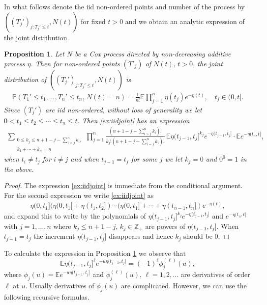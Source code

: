 \documentclass[11pt,leqno%
]{amsart}
\newtheorem{proposition}[lemma]{Proposition}
\newcommand{\E }{{\mathbb E}}
\newcommand{\Z }{{\mathbb Z}}
\renewcommand{\P }{{\mathbb P}}
\newcommand{\1}{{\mathbf 1}}
\begin{document}
In what follows denote the iid non-ordered points and number of the process
by $((T_j')_{j:T_j'\le t},N(t))$ for fixed $t>0$ and we obtain an analytic
expression of the joint distribution. 
\begin{proposition}
\label{prop:jointdist}
 Let $N$ be a Cox process directed by non-decreasing additive process
 $\eta$. Then for non-ordered points $(T'_j)$ of $N(t),\,t>0$, the joint distribution of $((T_j')_{j:T_j'\le t},N(t))$ is 
\begin{align}
\label{ex:iidjoint}
 \P(T_1' \le t_1,\ldots,T_n' \le t_n,\,N(t)=n) =
 \frac{1}{n!}\E \prod_{j=1}^n \eta(t_j) e^{-\eta(t)},\quad t_j\in
 (0,t]. 
\end{align}
 Since $(T_j')$ are iid non-ordered, without loss of
 generality we let $0<t_1\le t_2\le \cdots \le t_n \le t$. Then
 \eqref{ex:iidjoint} has an expression 
\begin{align*}
 \sum_{\substack{0\le k_j \le n+1-j-\sum_{i>j}^n k_i, \\ k_1+\cdots +k_n=n}} \prod_{j=1}^n
 \frac{(n+1-j-\sum_{i>j}^n k_i)!}{k_j!(n+1-j-\sum_{i=j}^n k_i)! }\, 
 \E \eta(t_{j-1},t_j]^{k_j} e^{-\eta(t_{j-1},t_j]}\cdot \E
 e^{-\eta(t_n,t]},  
\end{align*}
 when $t_i\neq t_j$ for $i\neq j$ and when $t_{j-1}=t_j$ for some $j$ we
 let $k_j=0$ and $0^0=1$ in the above. 
\end{proposition}

\begin{proof}
 The expression \eqref{ex:iidjoint} is immediate from the conditional
 argument. For the second expression we write \eqref{ex:iidjoint} as 
\begin{align*}
 \eta(0,t_1](\eta(0,t_1]+\eta(t_1,t_2])\cdots(\eta(0,t_1]+\cdots+\eta(t_{n-1},t_n])
 e^{-\eta(t)}, 
\end{align*}
 and expand this to write by the polynomials of
 $\eta(t_{j-1},t_j]^{k_j}e^{-\eta(t_{j-1},t_j]}$ and $e^{-\eta(t_n,t]}$ with
 $j=1,\ldots,n$ where $k_j\le n+1-j,\,k_j\in \Z_+$ are powers of
 $\eta(t_{j-1},t_j]$. When $t_{j-1}=t_j$ the increment
 $\eta(t_{j-1},t_j]$ disappears and hence $k_j$ should be $0$.  
\end{proof}

To calculate the expression in Proposition \ref{prop:jointdist} we
observe that 
\[
 \E \eta(t_{j-1},t_j]^\ell e^{-u \eta(t_{j-1},t_j]}= (-1)^\ell
 \phi_j^{(\ell)}(u), 
\]
where $\phi_j(u)=\E e^{-u\eta(t_{j-1},t_j]}$ and
$\phi_j^{(\ell)}(u),\,\ell=1,2,\ldots$ are derivatives of order $\ell$ at $u$. 
Usually derivatives of $\phi_j(u)$ are complicated. However, we can use
the following recursive formulas.
\end{document}
